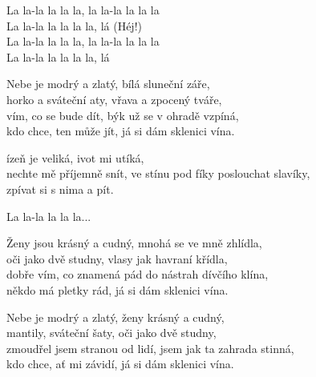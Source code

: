 
\re{}
La la-la la la la, la la-la la la la\\
La la-la la la la la, lá \quad (Héj!)\\
La la-la la la la, la la-la la la la\\
La la-la la la la la, lá

\ve{}
Nebe je modrý a zlatý, bílá sluneční záře,\\
horko a sváteční aty, vřava a zpocený tváře,\\
vím, co se bude dít, býk už se v ohradě vzpíná,\\
kdo chce, ten může jít, já si dám sklenici vína.

\cho{}
ízeň je veliká, ivot mi utíká,\\
nechte mě příjemně snít,
ve stínu pod fíky poslouchat slavíky,\\
zpívat si s nima a pít.

La la-la la la la...

\ve{}
Ženy jsou krásný a cudný, mnohá se ve mně zhlídla,\\
oči jako dvě studny, vlasy jak havraní křídla,\\
dobře vím, co znamená pád do nástrah dívčího klína,\\
někdo má pletky rád, já si dám sklenici vína.

\cho{}

\ve{}
Nebe je modrý a zlatý, ženy krásný a cudný,\\
mantily, sváteční šaty, oči jako dvě studny,\\
zmoudřel jsem stranou od lidí, jsem jak ta zahrada stinná,\\
kdo chce, ať mi závidí, já si dám sklenici vína.

\cho{}

\esong